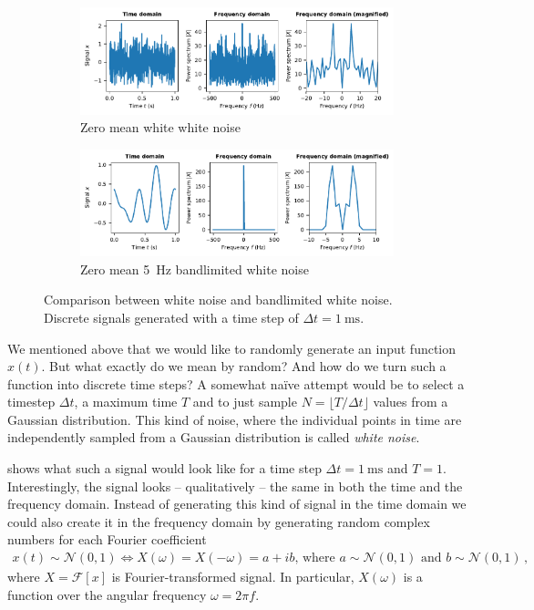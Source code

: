 \documentclass[10pt,letterpaper,oneside]{article}
\begin{document}
\begin{figure}
	\centering
	\begin{subfigure}{\textwidth}
		\centering
		\includegraphics{media/white_noise.pdf}
		\caption{Zero mean white white noise}
		\label{fig:white_noise}
	\end{subfigure}
	\begin{subfigure}{\textwidth}
		\centering
		\includegraphics{media/white_noise_5hz.pdf}
		\caption{Zero mean \SI{5}{\hertz} bandlimited white noise}
		\label{fig:white_noise_5hz}
	\end{subfigure}
	\caption{Comparison between white noise and bandlimited white noise. Discrete signals generated with a time step of $\Delta t = \SI{1}{\milli\second}$. }
\end{figure}

We mentioned above that we would like to randomly generate an input function $x(t)$. But what exactly do we mean by random? And how do we turn such a function into discrete time steps? A somewhat na\" ive attempt would be to select a timestep $\Delta t$, a maximum time $T$ and to just sample $N = \lfloor T / \Delta t \rfloor$ values from a Gaussian distribution. This kind of noise, where the individual points in time are independently sampled from a Gaussian distribution is called \emph{white noise}.

 shows what such a signal would look like for a time step $\Delta t = \SI{1}{\milli\second}$ and $T = 1$. Interestingly, the signal looks -- qualitatively -- the same in both the time and the frequency domain. Instead of generating this kind of signal in the time domain we could also create it in the frequency domain by generating random complex numbers for each Fourier coefficient
\begin{align*}
	x(t) \sim \mathcal{N}(0, 1) \Leftrightarrow X(\omega) = X(-\omega) = a + ib \text{, where } a \sim \mathcal{N}(0, 1) \text{ and } b \sim \mathcal{N}(0, 1) \,,
\end{align*}
where $X = \mathcal{F}[x]$ is Fourier-transformed signal. In particular, $X(\omega)$ is a function over the angular frequency $\omega = 2\pi f$.
\end{document}
